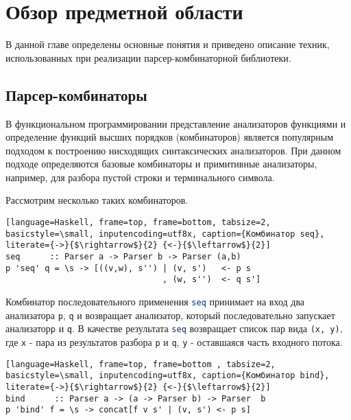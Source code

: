 \section{Обзор предметной области}
В данной главе определены основные понятия и приведено описание техник, использованных при реализации парсер-комбинаторной библиотеки.

    \subsection{Парсер-комбинаторы}
В функциональном программировании представление анализаторов функциями и определение функций высших порядков (комбинаторов) является популярным подходом к построению нисходящих синтаксических анализаторов. При данном подходе определяются базовые комбинаторы и примитивные анализаторы, например, для разбора пустой строки и терминального символа.

Рассмотрим несколько таких комбинаторов.

\begin{lstlisting}[language=Haskell, frame=top, frame=bottom, tabsize=2, basicstyle=\small, inputencoding=utf8x, caption={Комбинатор seq}, literate={->}{$\rightarrow$}{2} {<-}{$\leftarrow$}{2}]
seq      :: Parser a -> Parser b -> Parser (a,b)
p 'seq' q = \s -> [((v,w), s'') | (v, s')   <- p s
                                , (w, s'')  <- q s']
\end{lstlisting}

Комбинатор последовательного применения \lstinline[language=Haskell]{seq} принимает на вход два анализатора \lstinline[language=Haskell]{p}, \lstinline[language=Haskell]{q} и возвращает анализатор, который последовательно запускает анализатор\lstinline[language=Haskell]{p} и \lstinline[language=Haskell]{q}. В качестве результата \lstinline[language=Haskell]{seq} возвращает список пар вида \lstinline[language=Haskell]{(x, y)}, где \lstinline[language=Haskell]{x} - пара из результатов разбора \lstinline[language=Haskell]{p} и \lstinline[language=Haskell]{q}, \lstinline[language=Haskell]{y} - оставшаяся часть входного потока.

\begin{lstlisting}[language=Haskell, frame=top, frame=bottom , tabsize=2, basicstyle=\small, inputencoding=utf8x, caption={Комбинатор bind}, literate={->}{$\rightarrow$}{2} {<-}{$\leftarrow$}{2}]
bind      :: Parser a -> (a -> Parser b) -> Parser  b
p 'bind' f = \s -> concat[f v s' | (v, s') <- p s]
\end{lstlisting}
   
